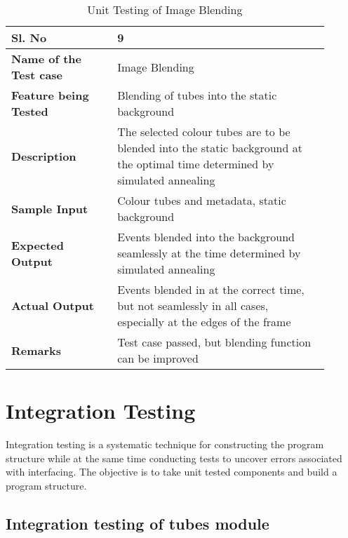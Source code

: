         \FloatBarrier
        \begin{table}[H]
            \begin{tabular}{|p{0.3\linewidth}|p{0.6\linewidth}|}
                \hline
                \textbf{Sl. No }              &\textbf{ 9}\\
                \hline
                \textbf{Name of the Test case}  & Image Blending \\
                \hline
                \textbf{Feature being Tested}  & Blending of tubes into the static background \\
                \hline
                \textbf{Description}           & The selected colour tubes are to be blended into the static background at the optimal time determined by simulated annealing \\
                \hline
                \textbf{Sample Input}          & Colour tubes and metadata, static background \\
                \hline
                \textbf{Expected Output}       & Events blended into the background seamlessly at the time determined by simulated annealing \\
                \hline
                \textbf{Actual Output}         & Events blended in at the correct time, but not seamlessly in all cases, especially at the edges of the frame \\
                \hline
                \textbf{Remarks }              & Test case passed, but blending function can be improved \\
                \hline
            \end{tabular}
            \caption{Unit Testing of Image Blending}
            \label{table:unit-image-blending}
        \end{table}

\section{Integration Testing}

Integration testing is a systematic technique for constructing the program structure while at the same time conducting tests to uncover errors associated with interfacing. The objective is to take unit tested components and build a program structure.

    \subsection{Integration testing of tubes module}

